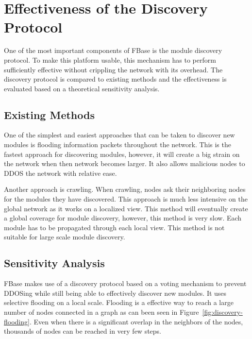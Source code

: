 
\section{Effectiveness of the Discovery Protocol}


One of the most important components of FBase is the module discovery protocol. To make this platform usable, this mechanism has to perform sufficiently effective without crippling the network with its overhead. The discovery protocol is compared to existing methods and the effectiveness is evaluated based on a theoretical sensitivity analysis.

\subsection{Existing Methods}

One of the simplest and easiest approaches that can be taken to discover new modules is flooding information packets throughout the network. This is the fastest approach for discovering modules, however, it will create a big strain on the network when then network becomes larger. It also allows malicious nodes to DDOS the network with relative ease.

Another approach is crawling. When crawling, nodes ask their neighboring nodes for the modules they have discovered. This approach is much less intensive on the global network as it works on a localized view. This method will eventually create a global coverage for module discovery, however, this method is very slow. Each module has to be propagated through each local view. This method is not suitable for large scale module discovery.

\subsection{Sensitivity Analysis}

FBase makes use of a discovery protocol based on a voting mechanism to prevent DDOSing while still being able to effectively discover new modules. It uses selective flooding on a local scale. Flooding is a effective way to reach a large number of nodes connected in a graph as can been seen in Figure~\ref{fig:discovery-flooding}. Even when there is a significant overlap in the neighbors of the nodes, thousands of nodes can be reached in very few steps.

